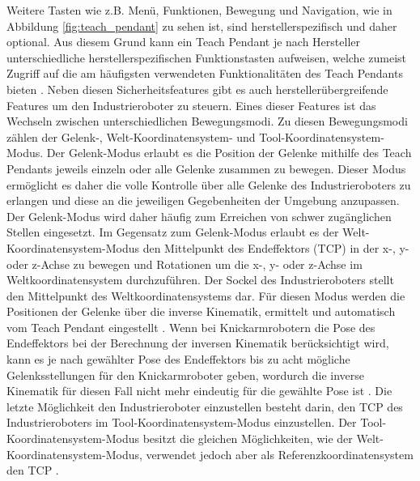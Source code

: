 Weitere Tasten wie z.B. Menü, Funktionen, Bewegung und Navigation, wie in Abbildung \ref{fig:teach_pendant} zu sehen ist, sind herstellerspezifisch und daher optional. Aus diesem Grund kann ein Teach Pendant je nach Hersteller unterschiedliche herstellerspezifischen Funktionstasten aufweisen, welche zumeist Zugriff auf die am häufigsten verwendeten Funktionalitäten des Teach Pendants bieten \cite{dinwiddie_basic_2015}. Neben diesen Sicherheitsfeatures gibt es auch herstellerübergreifende Features um den Industrieroboter zu steuern. Eines dieser Features ist das Wechseln zwischen unterschiedlichen Bewegungsmodi. Zu diesen Bewegungsmodi zählen der Gelenk-, Welt-Koordinatensystem- und Tool-Koordinatensystem-Modus. Der Gelenk-Modus erlaubt es die Position der Gelenke mithilfe des Teach Pendants jeweils einzeln oder alle Gelenke zusammen zu bewegen. Dieser Modus ermöglicht es daher die volle Kontrolle über alle Gelenke des Industrieroboters zu erlangen und diese an die jeweiligen Gegebenheiten der Umgebung anzupassen. Der Gelenk-Modus wird daher häufig zum Erreichen von schwer zugänglichen Stellen eingesetzt. Im Gegensatz zum Gelenk-Modus erlaubt es der Welt-Koordinatensystem-Modus den Mittelpunkt des Endeffektors (TCP) in der x-, y- oder z-Achse zu bewegen und Rotationen um die x-, y- oder z-Achse im Weltkoordinatensystem durchzuführen. Der Sockel des Industrieroboters stellt den Mittelpunkt des Weltkoordinatensystems dar. Für diesen Modus werden die Positionen der Gelenke über die inverse Kinematik, ermittelt und automatisch vom Teach Pendant eingestellt \cite{jogging_2017}. Wenn bei Knickarmrobotern die Pose des Endeffektors bei der Berechnung der inversen Kinematik berücksichtigt wird, kann es je nach gewählter Pose des Endeffektors bis zu acht mögliche Gelenksstellungen für den Knickarmroboter geben, wordurch die inverse Kinematik für diesen Fall nicht mehr eindeutig für die gewählte Pose ist \cite[25]{pott_industrielle_2019}. Die letzte Möglichkeit den Industrieroboter einzustellen besteht darin, den TCP des Industrieroboters im Tool-Koordinatensystem-Modus einzustellen. Der Tool-Koordinatensystem-Modus besitzt die gleichen Möglichkeiten, wie der Welt-Koordinatensystem-Modus, verwendet jedoch aber als Referenzkoordinatensystem den TCP \cite{jogging_2017}.





